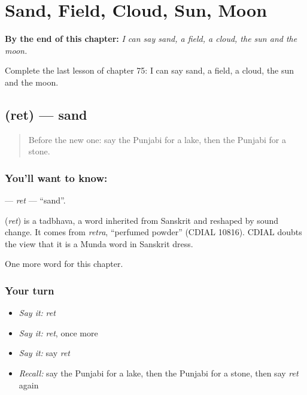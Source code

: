 
\chapter{Sand, Field, Cloud, Sun, Moon}
\label{ch:pa-sand-field-cloud-sun-moon}

\begin{chapteropening}
\textbf{By the end of this chapter:} \emph{I can say sand, a field, a cloud, the sun and the moon.}

Complete the last lesson of chapter 75: I can say sand, a field, a cloud, the sun and the moon.
\end{chapteropening}

\section[\texorpdfstring{\pa{ਰੇਤ} (ret)}{ਰੇਤ (ret)}]{ (ret) — sand}

\label{lesson:PA-C75-ret}



\begin{quote}
Before the new one: say the Punjabi for a lake, then the Punjabi for a stone.
\end{quote}

\subsection*{You'll want to know: }
\textbf{} — \emph{ret} — \textquotedblleft{}sand\textquotedblright{}.

\begin{cousinweb}
\textbf{} (\emph{ret}) is a tadbhava, a word inherited from Sanskrit and reshaped by sound change. It comes from \emph{retra}, \textquotedblleft{}perfumed powder\textquotedblright{} (CDIAL 10816). CDIAL doubts the view that it is a Munda word in Sanskrit dress.
\end{cousinweb}

\begin{grammarlens}[title={What you've built}]
One more word for this chapter.
\end{grammarlens}

\subsection*{Your turn}
\begin{itemize}
\raggedright
  \item \emph{Say it:} \emph{ret}
  \item \emph{Say it:} \emph{ret}, once more
  \item \emph{Say it:} say \emph{ret}
  \item \emph{Recall:} say the Punjabi for a lake, then the Punjabi for a stone, then say \emph{ret} again
\end{itemize}

